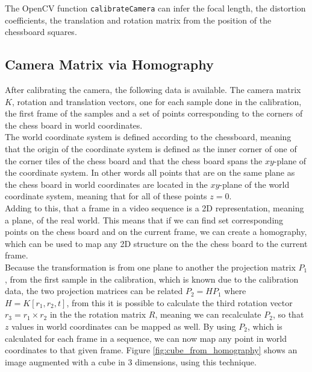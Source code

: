 \documentclass[a4paper,11pt]{article}
\begin{document}
The OpenCV function \texttt{calibrateCamera} can infer the focal length, the distortion coefficients, the translation and rotation matrix from the position of the chessboard squares.

\subsection{Camera Matrix via Homography}
After calibrating the camera, the following data is available. The camera matrix $K$, rotation and translation vectors, one for each sample done in the calibration, the first frame of the samples and a set of points corresponding to the corners of the chess board in world coordinates.\\

The world coordinate system is defined according to the chessboard, meaning that the origin of the coordinate system is defined as the inner corner of one of the corner tiles of the chess board and that the chess board spans the $xy$-plane of the coordinate system. In other words all points that are on the same plane as the chess board in world coordinates are located in the $xy$-plane of the world coordinate system, meaning that for all of these points $z=0$.\\

Adding to this, that a frame in a video sequence is a 2D representation, meaning a plane, of the real world. This means that if we can find set corresponding points on the chess board and on the current frame, we can create a homography, which can be used to map any 2D structure on the the chess board to the current frame.\\

Because the transformation is from one plane to another the projection matrix $P_1$, from  the first sample in the calibration, which is known due to the calibration data, the two projection matrices can be related $P_2 = H P_1$ where $H = K[r_1,r_2,t]$, from this it is possible to calculate the third rotation vector $r_3 = r_1 \times r_2$ in the the rotation matrix $R$, meaning we can recalculate $P_2$, so that $z$ values in world coordinates can be mapped as well. By using $P_2$, which is calculated for each frame in a sequence, we can now map any point in world coordinates to that given frame. Figure \ref{fig:cube_from_homography} shows an image augmented with a cube in 3 dimensions, using this technique.\\
\end{document}
